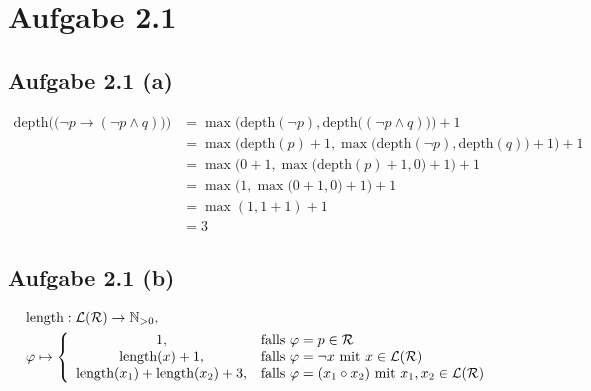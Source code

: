 \documentclass[12pt,a4paper]{article}
\author{Willi Sontopski}
\newcommand{\depth}{\text{depth}}
\newcommand{\length}{\text{length}}
\begin{document}

\section*{Aufgabe 2.1}
\subsection*{Aufgabe 2.1 (a)}
\begin{align*}
\depth\Big(\big(\neg p\to(\neg p\wedge q)\big)\Big)
&=\max\Big(\depth(\neg p),\depth\big((\neg p\wedge q)\big)\Big)+1\\
&=\max\Big(\depth(p)+1,\max\big(\depth(\neg p),\depth(q)\big)+1\Big)+1\\
&=\max\Big(0+1,\max\big(\depth(p)+1,0\big)+1\Big)+1\\
&=\max\Big(1,\max\big(0+1,0\big)+1\Big)+1\\
&=\max(1,1+1)+1\\
&=3
\end{align*}

\subsection*{Aufgabe 2.1 (b)}
\begin{align*}
&\length:\mathcal{L}(\mathcal{R})\to\N_{>0},\qquad\\
&\varphi\mapsto\left\lbrace\begin{array}{cl}
1, & \falls \varphi=p\in\mathcal{R}\\
\length(x) + 1, & \falls \varphi=\neg x\mit x\in\mathcal{L}(\mathcal{R})\\
\length(x_1) + \length(x_2) + 3, & \falls \varphi=(x_1\circ x_2)\mit x_1,x_2\in\mathcal{L}(\mathcal{R})%
\end{array}\right.
\end{align*}
\end{document}
